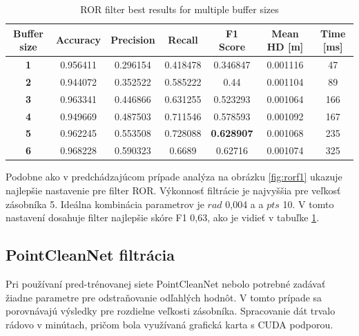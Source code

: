 \begin{table}[h]
	\centering
	\caption{\label{tab:ror_best} ROR filter best results for multiple buffer sizes }
	\begin{tabular}{ccccccc}
		\toprule
		\textbf{Buffer size} & \textbf{Accuracy} & \textbf{Precision} & \textbf{Recall} & \textbf{F1 Score} & \textbf{Mean HD [m]} & \textbf{Time [ms]} \\ 
		\midrule
		\textbf{1}           & 0.956411          & 0.296154           & 0.418478        & 0.346847          & 0.001116          & 47            \\ 
		\textbf{2}           & 0.944072          & 0.352522           & 0.585222        & 0.44              & 0.001104          & 89            \\ 
		\textbf{3}           & 0.963341          & 0.446866           & 0.631255        & 0.523293          & 0.001064          & 166           \\
		\textbf{4}           & 0.949669          & 0.487503           & 0.711546        & 0.578593          & 0.001092          & 167           \\ 
		\textbf{5}           & 0.962245          & 0.553508           & 0.728088        & \textbf{0.628907}          & 0.001068 & 235           \\ 
		\textbf{6}           & 0.968228          & 0.590323           & 0.6689          & 0.62716           & 0.001074          & 325           \\ 
		\bottomrule
	\end{tabular}
\end{table}

Podobne ako v predchádzajúcom prípade analýza na obrázku \ref{fig:rorf1} ukazuje najlepšie nastavenie pre filter ROR. Výkonnosť filtrácie je najvyššia pre veľkosť zásobníka 5. Ideálna kombinácia parametrov je $rad$ 0,004 a a $pts$ 10. V tomto nastavení dosahuje filter najlepšie skóre F1 0,63, ako je vidieť v tabuľke \ref{tab:ror_best}.

\subsection{PointCleanNet filtrácia}
Pri používaní pred-trénovanej siete PointCleanNet nebolo potrebné zadávať žiadne parametre pre odstraňovanie odľahlých hodnôt. V tomto prípade sa porovnávajú výsledky pre rozdielne veľkosti zásobníka. Spracovanie dát trvalo rádovo v minútach, pričom bola využívaná grafická karta s CUDA podporou.

